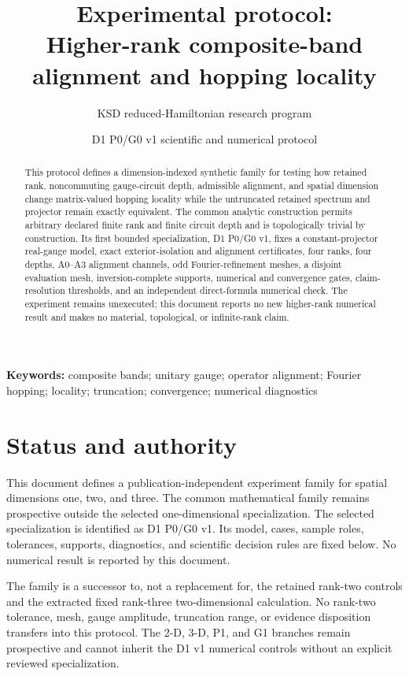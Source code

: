 \documentclass[11pt]{article}
\title{\textbf{Experimental protocol:\\
Higher-rank composite-band alignment and hopping locality}}
\author{KSD reduced-Hamiltonian research program}
\date{D1 P0/G0 v1 scientific and numerical protocol}
\begin{document}
\maketitle

\begin{abstract}
This protocol defines a dimension-indexed synthetic family for testing how retained
rank, noncommuting gauge-circuit depth, admissible alignment, and spatial dimension
change matrix-valued hopping locality while the untruncated retained spectrum and
projector remain exactly equivalent. The common analytic construction permits arbitrary
declared finite rank and finite circuit depth and is topologically trivial by
construction. Its first bounded specialization, D1 P0/G0 v1, fixes a constant-projector
real-gauge model, exact exterior-isolation and alignment certificates, four ranks, four
depths, A0--A3 alignment channels, odd Fourier-refinement meshes, a disjoint evaluation
mesh, inversion-complete supports, numerical and convergence gates, claim-resolution
thresholds, and an independent direct-formula numerical check. The experiment remains
unexecuted; this document reports no new higher-rank numerical result and makes no
material, topological, or infinite-rank claim.
\end{abstract}

\noindent\textbf{Keywords:} composite bands; unitary gauge; operator alignment;
Fourier hopping; locality; truncation; convergence; numerical diagnostics


\section{Status and authority}

This document defines a publication-independent experiment family for spatial dimensions
one, two, and three. The common mathematical family remains prospective outside the
selected one-dimensional specialization. The selected specialization is identified as
D1 P0/G0 v1. Its model, cases, sample roles, tolerances, supports, diagnostics, and
scientific decision rules are fixed below. No numerical result is reported by this
document.

The family is a successor to, not a replacement for, the retained rank-two controls and
the extracted fixed rank-three two-dimensional calculation. No rank-two tolerance, mesh,
gauge amplitude, truncation range, or evidence disposition transfers into this protocol.
The 2-D, 3-D, P1, and G1 branches remain prospective and cannot inherit the D1 v1
numerical controls without an explicit reviewed specialization.
\end{document}
